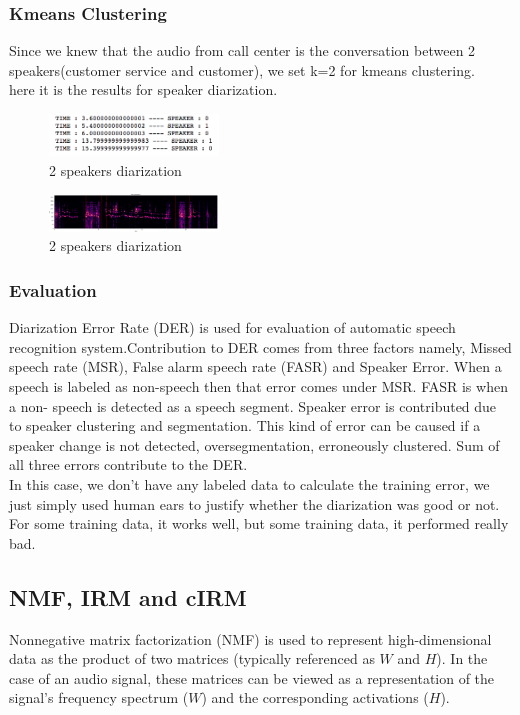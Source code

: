 \documentclass[journal, a4paper]{IEEEtran}
\begin{document}
\subsubsection{Kmeans Clustering}
Since we knew that the audio from call center is the conversation between 2 speakers(customer service and customer), we set k=2 for kmeans clustering.\\
here it is the results for speaker diarization.
\begin{figure}[h!]
    \centering  
     \caption{\label{Fig:speaker diarization}2 speakers diarization}  
    \includegraphics[width=0.4\textwidth]{kmeans01.png} 
\end{figure}

\begin{figure}[h!]
    \centering  
     \caption{\label{Fig:speaker diarization}2 speakers diarization}  
    \includegraphics[width=0.4\textwidth]{kmeans02.png}
\end{figure}
\subsubsection{Evaluation\cite{Segmentation}}Diarization Error Rate (DER) is used for evaluation of automatic speech recognition system.Contribution to DER comes from three factors namely, Missed speech rate (MSR), False alarm speech rate (FASR) and Speaker Error. When a speech is labeled as non-speech then that error comes under MSR. FASR is when a non- speech is detected as a speech segment. Speaker error is contributed due to speaker clustering and segmentation. This kind of error can be caused if a speaker change is not detected, oversegmentation, erroneously clustered. Sum of all three errors contribute to the DER.\\
In this case, we don't have any labeled data to calculate the training error, we just simply used human ears to justify whether the diarization was good or not. For some training data, it works well, but some training data, it performed really bad. 

\subsection{NMF, IRM and cIRM}
Nonnegative matrix factorization (NMF) is used to represent high-dimensional data as the product of two matrices (typically referenced as $W$ and $H$). In the case of an audio signal, these matrices can be viewed as a representation of the signal's frequency spectrum ($W$) and the corresponding activations ($H$).
\end{document}
